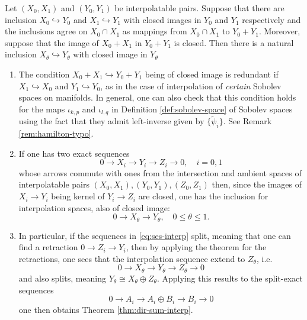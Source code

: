 \begin{theorem}[*]
\label{thm:interp-closed-emb}
Let \((X_0, X_1)\) and \((Y_0, Y_1)\) be interpolatable pairs. Suppose that there are
inclusion
\(X_0 \hookrightarrow  Y_0\) and \(X_1 \hookrightarrow  Y_1\)
with closed images in \(Y_0\) and \(Y_1\) respectively and the inclusions agree on \(X_0 \cap X_1\) as mappings from \(X_0\cap X_1\) to \(Y_0 + Y_1\). Moreover, suppose
that the image of \(X_0+X_1\) in \(Y_0+Y_1\) is closed. Then there is a
natural inclusion \(X_\theta \hookrightarrow Y_\theta\) with closed image in \(Y_\theta\)
\end{theorem}
\begin{remark}
\begin{enumerate}
\item The condition \(X_0+X_1 \hookrightarrow Y_0+Y_1\) being of closed image is redundant
if \(X_1 \hookrightarrow X_0\) and \(Y_1 \hookrightarrow Y_0\), as in the case of
interpolation of \emph{certain} Sobolev spaces on manifolds. In general, one can also check that this condition holds for the
maps \(\iota_{k,p}\) and \(\iota_{l,q}\) in Definition \ref{def:sobolev-space} of
Sobolev spaces using the fact that they admit left-inverse given by \(\{\tilde \psi_i\}\). See Remark \ref{rem:hamilton-typo}.
\item If one has two exact sequences
\begin{equation}
\label{eq:ses-interp}
0 \longrightarrow X_i \longrightarrow Y_i \longrightarrow Z_i \longrightarrow 0,\quad i=0,1
\end{equation}
whose arrows commute with ones from the intersection and ambient spaces of
interpolatable pairs \((X_0,X_1), (Y_0, Y_1), (Z_0, Z_1)\) then, since the images of
\(X_i \longrightarrow Y_i\) being kernel of \(Y_i \longrightarrow Z_i\) are
closed, one has the inclusion for interpolation spaces, also of closed image:
\[
    0 \longrightarrow X_\theta \longrightarrow Y_\theta,\quad 0\leq\theta\leq 1.
   \]
\item In particular, if the sequences in \eqref{eq:ses-interp} split, meaning that one can find
a retraction \(0 \longrightarrow Z_i \longrightarrow  Y_i\), then by applying the
theorem for the retractions, one sees that the interpolation sequence extend to \(Z_\theta\), i.e.
\[
    0 \longrightarrow X_\theta \longrightarrow Y_\theta \longrightarrow Z_\theta \longrightarrow 0
   \]
and also splits, meaning \(Y_\theta \cong X_\theta \oplus Z_\theta\). Applying this
results to the split-exact sequences \[ 0 \longrightarrow A_i \longrightarrow A_i\oplus
   B_i \longrightarrow B_i \longrightarrow 0\] one then obtains Theorem \ref{thm:dir-sum-interp}.
\end{enumerate}
\end{remark}

